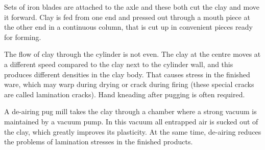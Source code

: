 Sets of iron blades are attached to the axle and these both cut the clay and 
move it forward. Clay is fed from one end and pressed out through a mouth piece 
at the other end in a continuous column, that is cut up in convenient pieces 
ready for forming.

The flow of clay through the cylinder is not even. The clay at the centre moves 
at a different speed compared to the clay next to the cylinder wall, and this 
produces different densities in the clay body. That causes stress in the 
finished ware, which may warp during drying or crack during firing (these 
special cracks are called lamination cracks). Hand kneading after pugging is 
often required.

A de-airing pug mill takes the clay through a chamber where a strong vacuum is 
maintained by a vacuum pump. In this vacuum all entrapped air is sucked out of 
the clay, which greatly improves its plasticity. At the same time, de-airing 
reduces the problems of lamination stresses in the finished products.
